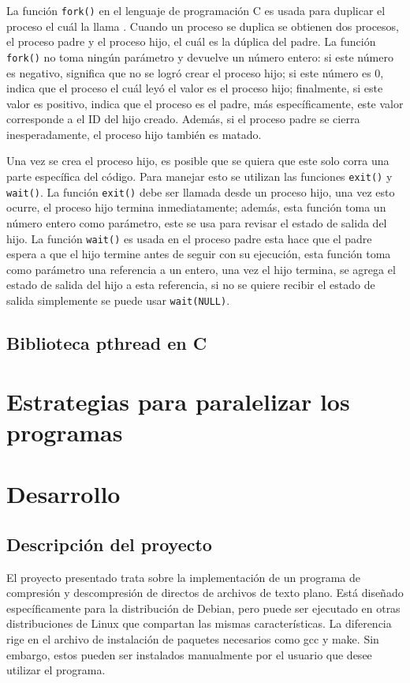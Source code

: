 \documentclass{report}
\begin{document}
La función \texttt{fork()} en el lenguaje de programación C es usada para duplicar el proceso el cuál la llama \cite{ref5}.
Cuando un proceso se duplica se obtienen dos procesos, el proceso padre y el proceso hijo, el cuál es la dúplica del padre.
La función \texttt{fork()} no toma ningún parámetro y devuelve un número entero: si este número es negativo, significa que no se logró crear el proceso hijo; si este número es 0, indica que el proceso el cuál leyó el valor es el proceso hijo; finalmente, si este valor es positivo, indica que el proceso es el padre, más específicamente, este valor corresponde a el ID del hijo creado. 
Además, si el proceso padre se cierra inesperadamente, el proceso hijo también es matado.

Una vez se crea el proceso hijo, es posible que se quiera que este solo corra una parte específica del código.
Para manejar esto se utilizan las funciones \texttt{exit()} y \texttt{wait()}.
La función \texttt{exit()} debe ser llamada desde un proceso hijo, una vez esto ocurre, el proceso hijo termina inmediatamente; además, esta función toma un número entero como parámetro, este se usa para revisar el estado de salida del hijo.
La función \texttt{wait()} es usada en el proceso padre esta hace que el padre espera a que el hijo termine antes de seguir con su ejecución, esta función toma como parámetro una referencia a un entero, una vez el hijo termina, se agrega el estado de salida del hijo a esta referencia, si no se quiere recibir el estado de salida simplemente se puede usar \texttt{wait(NULL)}.

\subsection {Biblioteca pthread en C}


\section {Estrategias para paralelizar los programas}


\section{Desarrollo}

\subsection{Descripción del proyecto}
El proyecto presentado trata sobre la implementación de un programa de compresión y descompresión de directos de archivos de texto plano. Está diseñado específicamente para la distribución de Debian, pero puede ser ejecutado en otras distribuciones de Linux que compartan las mismas características. La diferencia rige en el archivo de instalación de paquetes necesarios como gcc y make. Sin embargo, estos pueden ser instalados manualmente por el usuario que desee utilizar el programa.
\end{document}
